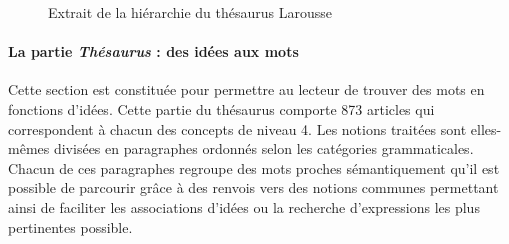 \begin{figure} [h]
    \begin{flushleft}
      \footnotesize{ 
          
          
          
         
          
          
           }
\end{flushleft}
\caption{Extrait de la hiérarchie du thésaurus Larousse
  \cite{Thesaurus1992}\label{fig:hierarchie-larousse}}
\end{figure}

\paragraph{La partie \emph{Thésaurus} : des idées aux mots}
\label{sec:thes-part}

Cette section est constituée pour permettre au lecteur de trouver des
mots en fonctions d'idées.  Cette partie du thésaurus comporte 873
articles qui correspondent à chacun des concepts de niveau 4. Les
notions traitées sont elles-mêmes divisées en paragraphes ordonnés
selon les catégories grammaticales.  Chacun de ces paragraphes
regroupe des mots proches sémantiquement qu'il est possible de
parcourir grâce à des renvois vers des notions communes permettant
ainsi de faciliter les associations d'idées ou la recherche
d'expressions les plus pertinentes possible.

